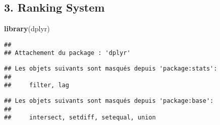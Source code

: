 \documentclass[
]{article}
\newenvironment{Shaded}{\begin{snugshade}}{\end{snugshade}}
\newcommand{\FunctionTok}[1]{\textcolor[rgb]{0.13,0.29,0.53}{\textbf{#1}}}
\newcommand{\NormalTok}[1]{#1}
\begin{document}
\subsection{3. Ranking System}\label{ranking-system}

\begin{Shaded}
\begin{Highlighting}[]
\FunctionTok{library}\NormalTok{(dplyr)}
\end{Highlighting}
\end{Shaded}

\begin{verbatim}
## 
## Attachement du package : 'dplyr'
\end{verbatim}

\begin{verbatim}
## Les objets suivants sont masqués depuis 'package:stats':
## 
##     filter, lag
\end{verbatim}

\begin{verbatim}
## Les objets suivants sont masqués depuis 'package:base':
## 
##     intersect, setdiff, setequal, union
\end{verbatim}
\end{document}
